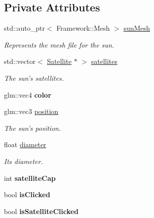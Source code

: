 \subsection*{Private Attributes}
\begin{DoxyCompactItemize}
\item 
\hypertarget{class_sun_a1aa72a3e0baeabd76642c48b969abf99}{std\-::auto\-\_\-ptr$<$ Framework\-::\-Mesh $>$ \hyperlink{class_sun_a1aa72a3e0baeabd76642c48b969abf99}{sun\-Mesh}}\label{class_sun_a1aa72a3e0baeabd76642c48b969abf99}

\begin{DoxyCompactList}\small\item\em Represents the mesh file for the sun. \end{DoxyCompactList}\item 
\hypertarget{class_sun_a0e5857745c6be53c3e2a6e518ff291d6}{std\-::vector$<$ \hyperlink{class_satellite}{Satellite} $\ast$ $>$ \hyperlink{class_sun_a0e5857745c6be53c3e2a6e518ff291d6}{satellites}}\label{class_sun_a0e5857745c6be53c3e2a6e518ff291d6}

\begin{DoxyCompactList}\small\item\em The sun's satellites. \end{DoxyCompactList}\item 
\hypertarget{class_sun_a195adefc09fba9b0382247bad484df4e}{glm\-::vec4 {\bfseries color}}\label{class_sun_a195adefc09fba9b0382247bad484df4e}

\item 
\hypertarget{class_sun_acab91a34acacee79bb743089738da5cc}{glm\-::vec3 \hyperlink{class_sun_acab91a34acacee79bb743089738da5cc}{position}}\label{class_sun_acab91a34acacee79bb743089738da5cc}

\begin{DoxyCompactList}\small\item\em The sun's position. \end{DoxyCompactList}\item 
\hypertarget{class_sun_ac35fc9ebc427d9c8c9fd3ee3a12fce82}{float \hyperlink{class_sun_ac35fc9ebc427d9c8c9fd3ee3a12fce82}{diameter}}\label{class_sun_ac35fc9ebc427d9c8c9fd3ee3a12fce82}

\begin{DoxyCompactList}\small\item\em Its {\itshape diameter}. \end{DoxyCompactList}\item 
\hypertarget{class_sun_a1c33d5e99fc2c6d51a43043504ecb9a4}{int {\bfseries satellite\-Cap}}\label{class_sun_a1c33d5e99fc2c6d51a43043504ecb9a4}

\item 
\hypertarget{class_sun_aa7d9c22a62eed3d761394d0acd87c5a3}{bool {\bfseries is\-Clicked}}\label{class_sun_aa7d9c22a62eed3d761394d0acd87c5a3}

\item 
\hypertarget{class_sun_a12b44931417d0d4329731cfd8a00ced9}{bool {\bfseries is\-Satellite\-Clicked}}\label{class_sun_a12b44931417d0d4329731cfd8a00ced9}

\end{DoxyCompactItemize}


